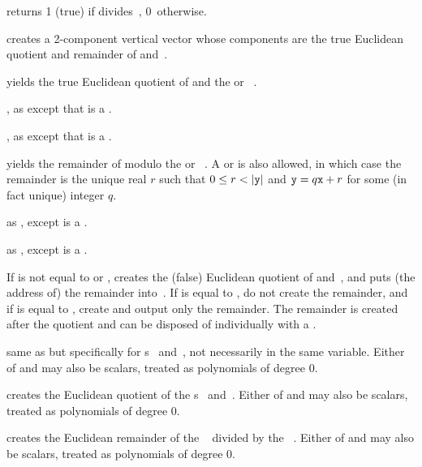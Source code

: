   returns 1 (true) if  divides~,
0~otherwise.

 creates a 2-component vertical
vector whose components are the true Euclidean quotient and remainder
of  and~.

 yields the true Euclidean
quotient of  and the  or ~.

, as 
except that  is a .

, as 
except that  is a .

 yields the remainder of 
modulo the  or ~. A  or  
is also allowed, in which case the remainder is the unique real $r$ such that
$0 \leq r < |{\tt y}|$ and ${\tt y} = q{\tt x} + r$ for some (in fact unique)
integer $q$.

 as , except  is
a .

 as , except  is
a .

 If  is not equal to
 or , creates the (false) Euclidean quotient of
 and~, and puts (the address of) the remainder into~.
If  is equal to , do not create the remainder, and if
 is equal to , create and output only the remainder.
The remainder is created after the quotient and can be disposed of
individually with a .

 same as  but
specifically for s~ and~, not necessarily in the same
variable. Either of  and  may also be scalars, treated as
polynomials of degree $0$.

 creates the Euclidean quotient of the
s~ and~. Either of  and  may also be
scalars, treated as polynomials of degree $0$.

 creates the Euclidean remainder of the
~ divided by the ~. Either of  and
 may also be scalars, treated as polynomials of degree $0$.


